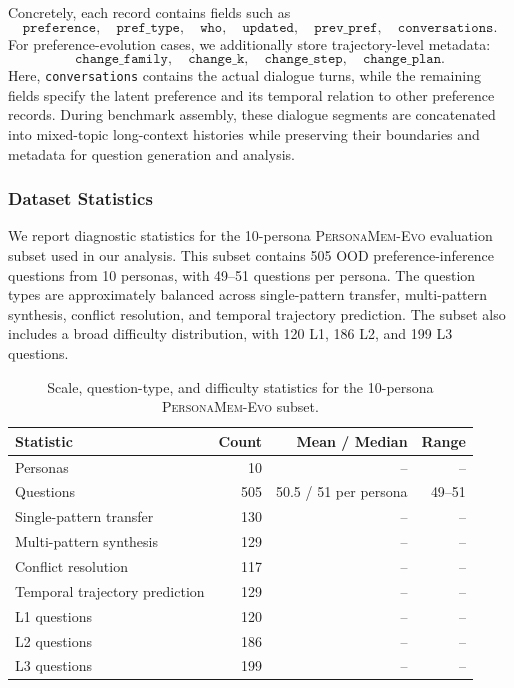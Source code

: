 \documentclass{llmxive}
\begin{document}
Concretely, each record contains fields such as
\[
\texttt{preference},\quad
\texttt{pref\_type},\quad
\texttt{who},\quad
\texttt{updated},\quad
\texttt{prev\_pref},\quad
\texttt{conversations}.
\]
For preference-evolution cases, we additionally store trajectory-level metadata:
\[
\texttt{change\_family},\quad
\texttt{change\_k},\quad
\texttt{change\_step},\quad
\texttt{change\_plan}.
\]
Here, \texttt{conversations} contains the actual dialogue turns, while the remaining fields specify the latent preference and its temporal relation to other preference records. During benchmark assembly, these dialogue segments are concatenated into mixed-topic long-context histories while preserving their boundaries and metadata for question generation and analysis.



\subsubsection{Dataset Statistics}
\label{app:persona_dataset_statistics}

We report diagnostic statistics for the 10-persona \textsc{PersonaMem-Evo} evaluation subset used in our analysis. This subset contains 505 OOD preference-inference questions from 10 personas, with 49--51 questions per persona. The question types are approximately balanced across single-pattern transfer, multi-pattern synthesis, conflict resolution, and temporal trajectory prediction. The subset also includes a broad difficulty distribution, with 120 L1, 186 L2, and 199 L3 questions.

\begin{table}[!htbp]
\centering
\small
\begin{tabular}{lrrr}
\toprule
\textbf{Statistic} & \textbf{Count} & \textbf{Mean / Median} & \textbf{Range} \\
\midrule
Personas & 10 & -- & -- \\
Questions & 505 & 50.5 / 51 per persona & 49--51 \\
\midrule
Single-pattern transfer & 130 & -- & -- \\
Multi-pattern synthesis & 129 & -- & -- \\
Conflict resolution & 117 & -- & -- \\
Temporal trajectory prediction & 129 & -- & -- \\
\midrule
L1 questions & 120 & -- & -- \\
L2 questions & 186 & -- & -- \\
L3 questions & 199 & -- & -- \\
\bottomrule
\end{tabular}
\caption{Scale, question-type, and difficulty statistics for the 10-persona \textsc{PersonaMem-Evo} subset.}
\label{tab:personamem_evo_10p_scale}
\end{table}
\end{document}
